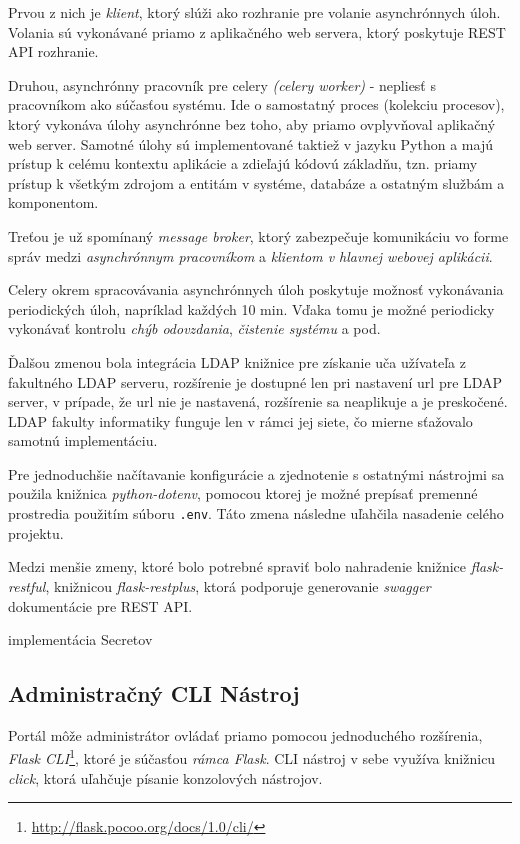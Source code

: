 \documentclass[
  digital, %
  twoside, %
  table,   %
  lof,     %
  lot,     %
]{fithesis3}
\begin{document}
Prvou z nich je \emph{klient}, ktorý slúži ako rozhranie pre volanie asynchrónnych úloh. Volania sú vykonávané priamo z aplikačného web servera, ktorý poskytuje REST API rozhranie.

Druhou, asynchrónny pracovník pre celery \emph{(celery worker)} - nepliesť s pracovníkom ako súčasťou systému. Ide o samostatný proces (kolekciu procesov), ktorý vykonáva úlohy asynchrónne bez toho, aby priamo ovplyvňoval aplikačný web server. Samotné úlohy sú implementované taktiež v jazyku Python a majú prístup k celému kontextu aplikácie a zdieľajú kódovú základňu, tzn. priamy prístup k všetkým zdrojom a entitám v systéme, databáze a ostatným službám a komponentom.

Treťou je už spomínaný \emph{message broker}, ktorý zabezpečuje komunikáciu vo forme správ medzi \emph{asynchrónnym pracovníkom} a \emph{klientom v hlavnej webovej aplikácii}.

Celery okrem spracovávania asynchrónnych úloh poskytuje možnosť vykonávania periodických úloh, napríklad každých 10 min. Vďaka tomu je možné periodicky vykonávať kontrolu \emph{chýb odovzdania}, \emph{čistenie systému} a pod. 



Ďalšou zmenou bola integrácia LDAP knižnice pre získanie uča užívateľa z fakultného LDAP serveru, rozšírenie je dostupné len pri nastavení url pre LDAP server, v prípade, že url nie je nastavená, rozšírenie sa neaplikuje a je preskočené. LDAP fakulty informatiky funguje len v rámci jej siete, čo mierne sťažovalo samotnú implementáciu.

Pre jednoduchšie načítavanie konfigurácie a zjednotenie s ostatnými nástrojmi sa použila knižnica \emph{python-dotenv}, pomocou ktorej je možné prepísať premenné prostredia použitím súboru \texttt{.env}. Táto zmena následne uľahčila nasadenie celého projektu.

Medzi menšie zmeny, ktoré bolo potrebné spraviť bolo nahradenie knižnice \emph{flask-restful}, knižnicou \emph{flask-restplus}, ktorá podporuje generovanie \emph{swagger} dokumentácie pre REST API. 

implementácia Secretov

\subsection{Administračný CLI Nástroj}

Portál môže administrátor ovládať priamo pomocou jednoduchého rozšírenia, \emph{Flask CLI}\footnote{\url{http://flask.pocoo.org/docs/1.0/cli/}}, ktoré je súčasťou \emph{rámca Flask}. CLI nástroj v sebe využíva knižnicu \emph{click}, ktorá uľahčuje písanie konzolových nástrojov. 
\end{document}
